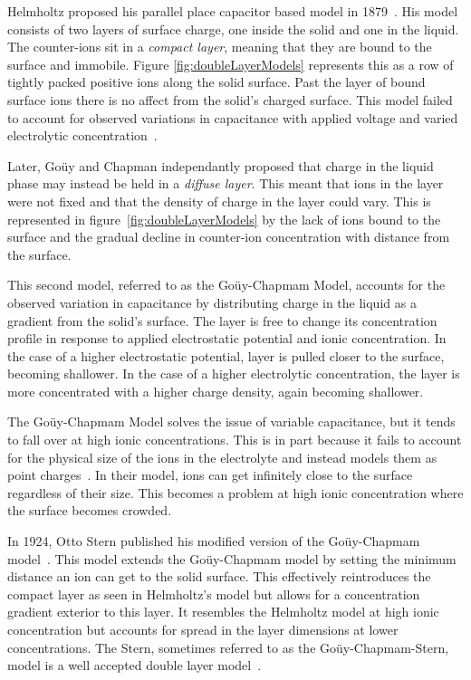     Helmholtz proposed his parallel place capacitor based model in 1879~\cite{Geddes1997}.
    His model consists of two layers of surface charge, one inside the solid and one in the liquid.
    The counter-ions sit in a \emph{compact layer}, meaning that they are bound to the surface and immobile.
    Figure \ref{fig:doubleLayerModels} represents this as a row of tightly packed positive ions along the solid surface.
    Past the layer of bound surface ions there is no affect from the solid's charged surface.
    This model failed to account for observed variations in capacitance with applied voltage and varied electrolytic concentration~\cite{Bard1980}.

    Later, Goüy and Chapman independantly proposed that charge in the liquid phase may instead be held in a \emph{diffuse layer}.
    This meant that ions in the layer were not fixed and that the density of charge in the layer could vary.
    This is represented in figure~\ref{fig:doubleLayerModels} by the lack of ions bound to the surface and the gradual decline in counter-ion concentration with distance from the surface.

    This second model, referred to as the Goüy-Chapmam Model, accounts for the observed variation in capacitance by distributing charge in the liquid as a gradient from the solid's surface.
    The layer is free to change its concentration profile in response to applied electrostatic potential and ionic concentration.
    In the case of a higher electrostatic potential, layer is pulled closer to the surface, becoming shallower.
    In the case of a higher electrolytic concentration, the layer is more concentrated with a higher charge density, again becoming shallower.

    The Goüy-Chapmam Model solves the issue of variable capacitance, but it tends to fall over at high ionic concentrations.
    This is in part because it fails to account for the physical size of the ions in the electrolyte and instead models them as point charges~\cite{Bard1980}.
    In their model, ions can get infinitely close to the surface regardless of their size.
    This becomes a problem at high ionic concentration where the surface becomes crowded.

    In 1924, Otto Stern published his modified version of the Goüy-Chapmam model~\cite{Stern1924}.
    This model extends the Goüy-Chapmam model by setting the minimum distance an ion can get to the solid surface.
    This effectively reintroduces the compact layer as seen in Helmholtz's model but allows for a concentration gradient exterior to this layer.
    It resembles the Helmholtz model at high ionic concentration but accounts for spread in the layer dimensions at lower concentrations.
    The Stern, sometimes referred to as the Goüy-Chapmam-Stern, model is a well accepted double layer model~\cite{Olthuis2005}.

